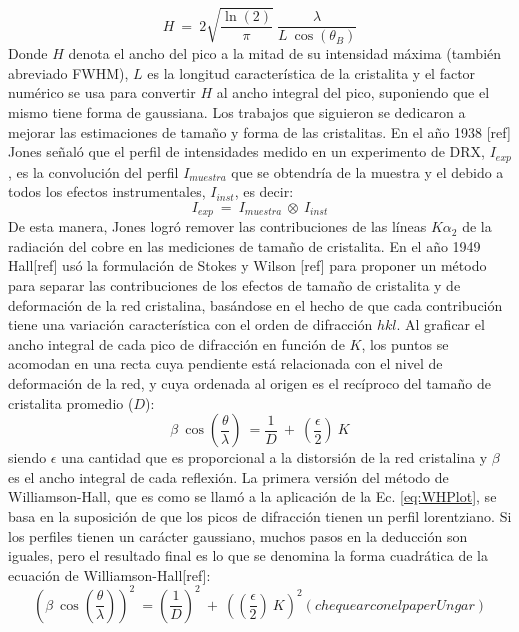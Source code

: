 \begin{equation}
  H \ = \ 2 \sqrt{\frac{\ln(2)}{\pi}} \ \frac{\lambda}{L \ \cos(\theta_B)}
  \label{eq:Scherrer}
\end{equation}
\noindent
Donde $H$ denota el ancho del pico a la mitad de su intensidad máxima (también abreviado FWHM), $L$ es la longitud característica de la cristalita y el factor numérico se usa para convertir $H$ al ancho integral del pico, suponiendo que el mismo tiene forma de gaussiana. 
Los trabajos que siguieron se dedicaron a mejorar las estimaciones de tamaño y forma de las cristalitas. 
En el año 1938 [ref] Jones señaló que el perfil de intensidades medido en un experimento de DRX, $I_{exp}$, es la convolución del perfil $I_{muestra}$ que se obtendría de la muestra y el debido a todos los efectos instrumentales, $I_{inst}$, es decir:
\begin{equation}
  I_{exp} \ = \ I_{muestra} \ \otimes \ I_{inst}
  \label{eq:conv}
\end{equation}
\noindent
De esta manera, Jones logró remover las contribuciones de las líneas $K\alpha_2$ de la radiación del cobre en las mediciones de tamaño de cristalita. 
En el año 1949 Hall[ref] usó la formulación de Stokes y Wilson [ref] para proponer un método para separar las contribuciones de los efectos de tamaño de cristalita y de deformación de la red cristalina, basándose en el hecho de que cada contribución tiene una variación característica con el orden de difracción ${hkl}$.
Al graficar el ancho integral de cada pico de difracción en función de $K$, los puntos se acomodan en una recta cuya pendiente está relacionada con el nivel de deformación de la red, y cuya ordenada al origen es el recíproco del tamaño de cristalita promedio ($D$):
\begin{equation}
  \beta \ \cos\left(\frac{\theta}{\lambda}\right) \ = \frac{1}{D} \ + \ \left(\frac{\epsilon}{2}\right) \ K
  \label{eq:WHPlot}
\end{equation}
\noindent
siendo $\epsilon$ una cantidad que es proporcional a la distorsión de la red cristalina y $\beta$ es el ancho integral de cada reflexión. La primera versión del método de Williamson-Hall, que es como se llamó a la aplicación de la Ec. \ref{eq:WHPlot}, se basa en la suposición de que los picos de difracción tienen un perfil lorentziano. Si los perfiles tienen un carácter gaussiano, muchos pasos en la deducción son iguales, pero el resultado final es lo que se denomina la forma cuadrática de la ecuación de Williamson-Hall[ref]:
\begin{equation}
  (\beta \ \cos\left(\frac{\theta}{\lambda}\right))^2 \ = (\frac{1}{D})^2 \ + \ (\left(\frac{\epsilon}{2}\right) \ K)^2  (chequear con el paper Ungar)
  \label{eq:WHPlot2}
\end{equation}
